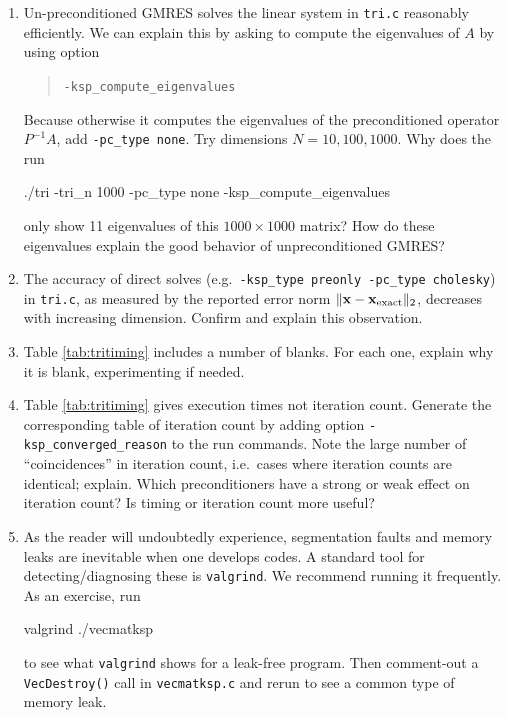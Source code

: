 \begin{enumerate}
\item \label{exer:computeeigs} Un-preconditioned GMRES solves the linear system in \texttt{tri.c} reasonably efficiently.  We can explain this by asking \PETSc to compute the eigenvalues of $A$ by using option
\begin{quote}
\texttt{-ksp\_compute\_eigenvalues}
\end{quote}
Because otherwise it computes the eigenvalues of the preconditioned operator $P^{-1}A$, add \texttt{-pc\_type none}.  Try dimensions $N=10,100,1000$.  Why does the  run
\begin{cline}
./tri -tri_n 1000 -pc_type none -ksp_compute_eigenvalues
\end{cline}
only show 11 eigenvalues of this $1000\times 1000$ matrix?  How do these eigenvalues explain the good behavior of unpreconditioned GMRES?

\item The accuracy of direct solves (e.g.~\texttt{-ksp\_type preonly -pc\_type cholesky}) in \texttt{tri.c}, as measured by the reported error norm $\|\mathbf{x} - \mathbf{x}_{\text{exact}}\|_2$, decreases with increasing dimension.  Confirm and explain this observation.

\item Table \ref{tab:tritiming} includes a number of blanks.  For each one, explain why it is blank, experimenting if needed.

\item Table \ref{tab:tritiming} gives execution times not iteration count.  Generate the corresponding table of \pKSP iteration count by adding option \verb|-ksp_converged_reason| to the run commands.  Note the large number of ``coincidences'' in iteration count, i.e.~cases where iteration counts are identical; explain.  Which preconditioners have a strong or weak effect on iteration count?  Is timing or iteration count more useful?

\item As the reader will undoubtedly experience, segmentation faults and memory leaks are inevitable when one develops \PETSc codes.  A standard tool for detecting/diagnosing these is \texttt{valgrind}.  We recommend running it frequently.  As an exercise, run
\begin{cline}
valgrind ./vecmatksp
\end{cline}
to see what \texttt{valgrind} shows for a leak-free program.  Then comment-out a \texttt{VecDestroy()} call in \texttt{vecmatksp.c} and rerun to see a common type of memory leak.
\end{enumerate}
